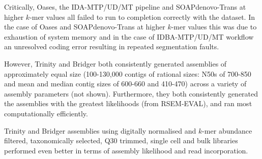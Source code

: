 Critically, Oases, the IDA-MTP/UD/MT pipeline and SOAPdenovo-Trans at higher \(k\)-mer values
all failed to run to completion correctly with the dataset.  In the case of Oases
and SOAPdenovo-Trans at higher \(k\)-mer values this was due to exhaustion
of system memory and in the case of IDBA-MTP/UD/MT workflow an unresolved coding error 
resulting in repeated segmentation faults.

However, Trinity and Bridger both consistently generated assemblies of approximately
equal size (100-130,000 contigs of rational sizes: N50s of 700-850
    and mean and median contig sizes of 600-660 and 410-470) across a variety 
    of assembly parameters (not shown).  Furthermore, they both consistently
    generated the assemblies with the greatest likelihoods (from RSEM-EVAL), 
    and ran most computationally efficiently. 


Trinity and Bridger assemblies using digitally normalised and \(k\)-mer abundance 
filtered, taxonomically selected, Q30 trimmed, single cell and bulk libraries performed 
even better in terms of assembly likelihood and read incorporation.

\begin{table}[h!]

    \caption[Trinity vs. bridger assemblies]{Assembly summaries of Q30 trimmed taxonomically selected SCT and bulk reads 
    after digital normalisation and \(k\)-mer abundance filtering. Parameters used in the assembly
indicates any special parameter settings used in the assembly i.e. K19 indicates a \(k\)-mer size of 19 was used.
}
    \label{tab:digassemby}
\end{table}

